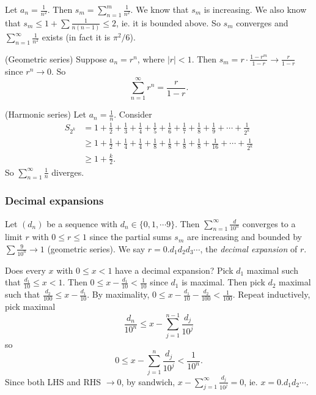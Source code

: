 \documentclass[a4paper]{article}
\begin{document}
\begin{eg}
  Let $a_n = \frac{1}{n^2}$. Then $s_m = \sum_{n = 1}^{m} \frac{1}{n^2}$. We know that $s_m$ is increasing. We also know that $s_m \leq 1 + \sum \frac{1}{n(n -1)} \leq 2$, ie. it is bounded above. So $s_m$ converges and $\sum_{n = 1}^{\infty} \frac{1}{n^2}$ exists (in fact it is $\pi^2/6$).
\end{eg}

\begin{eg}
  (Geometric series) Suppose $a_n = r^n$, where $|r| < 1$. Then $s_m = r\cdot \frac{1 - r^m}{1 - r} \to \frac{r}{1- r}$ since $r^n \to 0$. So
  \[
    \sum_{n = 1}^\infty r^n = \frac{r}{1 - r}.
  \]
\end{eg}

\begin{eg}
  (Harmonic series) Let $a_n = \frac{1}{n}$. Consider
  \begin{align*}
    S_{2^k} &= 1 + \frac{1}{2} + \frac{1}{3} + \frac{1}{4} + \frac{1}{5} + \frac{1}{6} + \frac{1}{7} + \frac{1}{8} + \frac{1}{9} + \cdots + \frac{1}{2^k}\\
    & \geq 1 + \frac{1}{2} + \frac{1}{4} + \frac{1}{4} + \frac{1}{8} + \frac{1}{8} + \frac{1}{8} + \frac{1}{8} + \frac{1}{16} + \cdots + \frac{1}{2^k}\\
    &\geq 1 + \frac{k}{2}.
  \end{align*}
  So $\displaystyle \sum_{n = 1}^\infty\frac{1}{n}$ diverges.
\end{eg}

\subsubsection*{Decimal expansions}
\begin{defi}
  Let $(d_n)$ be a sequence with $d_n\in \{0, 1, \cdots 9\}$. Then $\displaystyle \sum_{n = 1}^\infty \frac{d}{10^n}$ converges to a limit $r$ with $0 \leq r \leq 1$ since the partial sums $s_m$ are increasing and bounded by $\sum \frac{9}{10^n}\to 1$ (geometric series). We say $r = 0.d_1d_2d_3\cdots$, the \emph{decimal expansion} of $r$.
\end{defi}

Does every $x$ with $0 \leq x < 1$ have a decimal expansion?
Pick $d_1$ maximal such that $\frac{d_1}{10} \leq x < 1$. Then $0 \leq x - \frac{d_1}{10} < \frac{1}{10}$ since $d_1$ is maximal. Then pick $d_2$ maximal such that $\frac{d_2}{100} \leq x - \frac{d_1}{10}$. By maximality, $0 \leq x - \frac{d_1}{10} - \frac{d_2}{100} < \frac{1}{100}$. Repeat inductively, pick maximal
\[
  \frac{d_n}{10^n} \leq x- \sum_{j = 1}^{n - 1} \frac{d_j}{10^j}
\]
so
\[
  0 \leq x - \sum_{j = 1}^n \frac{d_j}{10^j} < \frac{1}{10^n}.
\]
Since both LHS and RHS $\to 0$, by sandwich, $x - \sum_{j = 1}^\infty \frac{d_j}{10^j} = 0$, ie. $x = 0.d_1d_2\cdots$.
\end{document}
